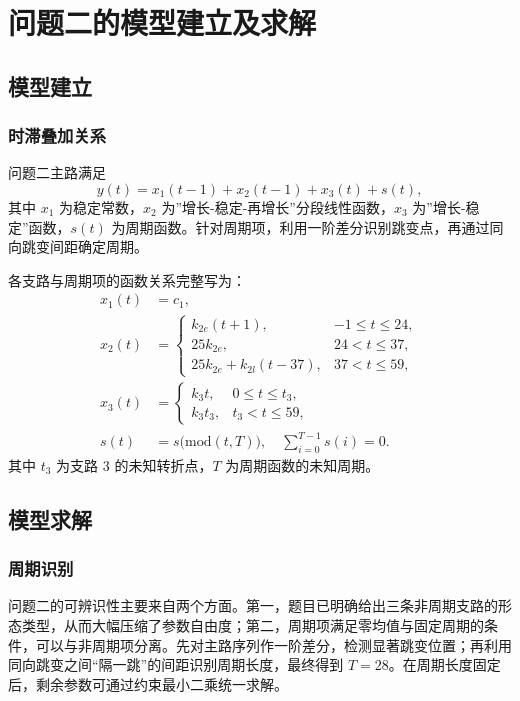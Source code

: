 \documentclass[UTF8,a4paper,fontset=none]{ctexart}
\numberwithin{equation}{section}
\begin{document}
\section{问题二的模型建立及求解}
\subsection{模型建立}
\subsubsection{时滞叠加关系}
问题二主路满足
\begin{equation}
y(t)=x_1(t-1)+x_2(t-1)+x_3(t)+s(t),
\end{equation}
其中 $x_1$ 为稳定常数，$x_2$ 为''增长-稳定-再增长''分段线性函数，$x_3$ 为''增长-稳定''函数，$s(t)$ 为周期函数。针对周期项，利用一阶差分识别跳变点，再通过同向跳变间距确定周期。

各支路与周期项的函数关系完整写为：
\begin{align}
  x_1(t) &= c_1, \label{eq:q2_f1} \\
  x_2(t) &= \begin{cases}
    k_{2e}(t+1), & -1\le t\le 24,\\
    25k_{2e}, & 24<t\le 37,\\
    25k_{2e}+k_{2l}(t-37), & 37<t\le 59,
  \end{cases} \label{eq:q2_f2} \\
  x_3(t) &= \begin{cases}
    k_3 t, & 0\le t\le t_3,\\
    k_3 t_3, & t_3<t\le 59,
  \end{cases} \label{eq:q2_f3} \\
  s(t) &= s\!\bigl(\mathrm{mod}(t,T)\bigr),\quad \sum_{i=0}^{T-1}s(i)=0. \label{eq:q2_f4}
\end{align}
其中 $t_3$ 为支路 3 的未知转折点，$T$ 为周期函数的未知周期。

\subsection{模型求解}
\subsubsection{周期识别}
问题二的可辨识性主要来自两个方面。第一，题目已明确给出三条非周期支路的形态类型，从而大幅压缩了参数自由度；第二，周期项满足零均值与固定周期的条件，可以与非周期项分离。先对主路序列作一阶差分，检测显著跳变位置；再利用同向跳变之间``隔一跳”的间距识别周期长度，最终得到 $T=28$。在周期长度固定后，剩余参数可通过约束最小二乘统一求解。
\end{document}
